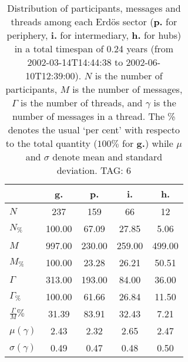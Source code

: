 \begin{table}[h!]
\begin{center}
\begin{tabular}{| l | c | c | c | c |}\hline
 & g. & p. & i. & h. \\\hline
$N$ & 237  & 159  & 66  & 12 \\\hline
$N_{\%}$ & 100.00  & 67.09  & 27.85  & 5.06 \\\hline
$M$ & 997.00  & 230.00  & 259.00  & 499.00 \\\hline
$M_{\%}$ & 100.00  & 23.28  & 26.21  & 50.51 \\\hline
$\Gamma$ & 313.00  & 193.00  & 84.00  & 36.00 \\\hline
$\Gamma_{\%}$ & 100.00  & 61.66  & 26.84  & 11.50 \\\hline
$\frac{\Gamma}{M}\%$ & 31.39  & 83.91  & 32.43  & 7.21 \\\hline
$\mu(\gamma)$ & 2.43  & 2.32  & 2.65  & 2.47 \\\hline
$\sigma(\gamma)$ & 0.49  & 0.47  & 0.48  & 0.50 \\\hline
\end{tabular}
\caption{Distribution of participants, messages and threads among each Erd\"os sector ({\bf p.} for periphery, {\bf i.} for intermediary, 
    {\bf h.} for hubs) in a total timespan of 0.24 years (from 2002-03-14T14:44:38 to 2002-06-10T12:39:00). $N$ is the number of participants, $M$ is the number of messages, $\Gamma$ is the number of threads, and $\gamma$ is the number of messages in a thread.
    The \% denotes the usual `per cent' with respecto to the total quantity ($100\%$ for {\bf g.})
    while $\mu$ and $\sigma$ denote mean and standard deviation. TAG: 6}
\end{center}
\end{table}